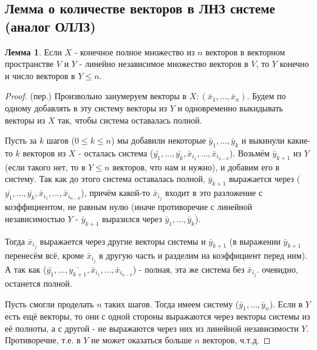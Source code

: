 \documentclass[a4paper, 12pt]{article}
\theoremstyle{definition}
\newtheorem*{lemma}{Лемма}
\begin{document}
	\subsection{Лемма о количестве векторов в ЛНЗ системе (аналог ОЛЛЗ)}
	\begin{lemma}
		Если $X$ - конечное полное множество из $n$ векторов в векторном пространстве $V$ и $Y$ - линейно независимое множество векторов в $V$, то $Y$ конечно и число векторов в $Y \leqslant n$. 
	\end{lemma}
	\begin{proof}
		(пер.)
		Произвольно занумеруем векторы в $X: (\bar{x}_{1},...,\bar{x}_{n})$.
		Будем по одному добавлять в эту систему векторы из $Y$ и одновременно выкидывать векторы из $X$ так, чтобы система оставалась полной.
		
		Пусть за $k$ шагов ($0\leqslant k \leqslant n$) мы добавили некоторые $\bar{y}_{1},...,\bar{y}_{k}$ и выкинули какие-то $k$ векторов из $X$ - осталась система ($\bar{y_{1}},...,\bar{y_{k}},\bar{x}_{i_{1}},...,\bar{x}_{i_{n-k}}$).
		Возьмём $\bar{y}_{k+1}$ из $Y$ (если такого нет, то в $Y \leqslant n$ векторов, что нам и нужно), и добавим его в систему. Так как до этого система оставалась полной, $\bar{y}_{k+1}$ выражается через ($\bar{y_{1}},...,\bar{y_{k}},\bar{x}_{i_{1}},...,\bar{x}_{i_{n-k}}$), причём какой-то $\bar{x}_{i_{j}}$ входит в это разложение с коэффициентом, не равным нулю (иначе противоречие с линейной независимостью $Y$ - $\bar{y}_{k+1}$ выразился через $\bar{y}_{1},...,\bar{y}_{k}$).
		
		Тогда $\bar{x}_{i_{j}}$ выражается через другие векторы системы и $\bar{y}_{k+1}$ (в выражении $\bar{y}_{k+1}$ перенесём всё, кроме $\bar{x}_{i_{j}}$ в другую часть и разделим на коэффициент перед ним).
		А так как ($\bar{y_{1}},...,\bar{y_{k+1}},\bar{x}_{i_{1}},...,\bar{x}_{i_{n-k}}$) - полная, эта же система без $\bar{x}_{i_{j}}$. очевидно, останется полной.

		Пусть смогли проделать $n$ таких шагов. Тогда имеем систему ($\bar{y}_{1},...,\bar{y}_n$). Если в $Y$ есть ещё векторы, то они с одной стороны выражаются через векторы системы из её полноты, а с другой - не выражаются через них из линейной независимости $Y$. Противоречие, т.е. в $Y$ не может оказаться больше $n$ векторов, ч.т.д.   
	\end{proof}
\end{document}
